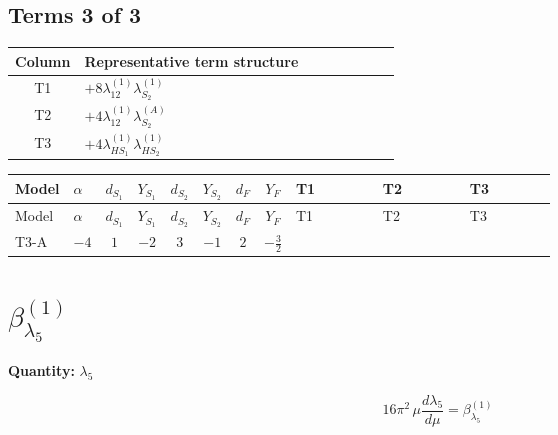 \documentclass[8pt]{article}
\begin{document}
\begin{landscape}
\subsection*{Terms 3 of 3}
\begin{center}
\begin{tabular}{@{}c >{\raggedright\arraybackslash}p{0.82\linewidth}@{}}
\toprule
Column & Representative term structure \\
\midrule
T1 & \(\displaystyle +8 {\lambda_{12}^{(1)}} {\lambda_{S_2}^{(1)}}\) \\
\midrule
T2 & \(\displaystyle +4 {\lambda_{12}^{(1)}} {\lambda_{S_2}^{(A)}}\) \\
\midrule
T3 & \(\displaystyle +4 {\lambda_{HS_1}^{(1)}} {\lambda_{HS_2}^{(1)}}\) \\
\midrule
\bottomrule
\end{tabular}
\end{center}
\smallskip
\tiny
\begin{longtable}{@{}llcccccc >{\raggedright\arraybackslash}p{0.21\linewidth} >{\raggedright\arraybackslash}p{0.21\linewidth} >{\raggedright\arraybackslash}p{0.21\linewidth}@{}}
\toprule
Model & $\alpha$ & $d_{S_1}$ & $Y_{S_1}$ & $d_{S_2}$ & $Y_{S_2}$ & $d_F$ & $Y_F$ & T1 & T2 & T3 \\
\midrule
\endfirsthead
\toprule
Model & $\alpha$ & $d_{S_1}$ & $Y_{S_1}$ & $d_{S_2}$ & $Y_{S_2}$ & $d_F$ & $Y_F$ & T1 & T2 & T3 \\
\midrule
\endhead
T3-A & $-4$ & $1$ & $-2$ & $3$ & $-1$ & $2$ & $-\frac{3}{2}$ & \scriptsize\adjustbox{max width=\linewidth}{$\begin{gathered} +8 {\lambda_{12}^{(1)}} {\lambda_{S_2}^{(1)}}\end{gathered}$} & \scriptsize\adjustbox{max width=\linewidth}{$\begin{gathered} +4 {\lambda_{12}^{(1)}} {\lambda_{S_2}^{(A)}}\end{gathered}$} & \scriptsize\adjustbox{max width=\linewidth}{$\begin{gathered} +4 {\lambda_{HS_1}^{(1)}} {\lambda_{HS_2}^{(1)}}\end{gathered}$} \\
\midrule
\bottomrule
\end{longtable}
\clearpage
\section*{$\beta_{\lambda_5}^{(1)}$}
\noindent\textbf{Quantity: }$\lambda_5$\par\smallskip
\[16\pi^2\,\mu\frac{d \lambda_5}{d\mu}=\beta_{\lambda_5}^{(1)}\]

\end{landscape}
\end{document}
